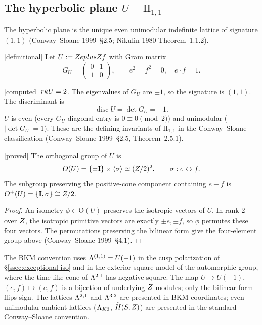 \subsection{The hyperbolic plane $U=\mathrm{II}_{1,1}$}
\label{app:lattice-U}

The hyperbolic plane is the unique even unimodular indefinite lattice
of signature $(1,1)$ (Conway--Sloane 1999~\S2.5; Nikulin 1980
Theorem~1.1.2).

\begin{definition}[$U=\mathrm{II}_{1,1}$]
\label{def:hyperbolic-plane}
\textnormal{[definitional]}
Let $U:=Z eplusZ f$ with Gram matrix
\[
G_U=\begin{pmatrix}0&1\\1&0\end{pmatrix},
\qquad e^2=f^2=0,\quad e\cdot f=1.
\]
\end{definition}

\begin{verification}
\label{ver:U-invariants}
\textnormal{[computed]}
$rk U=2$.  The eigenvalues of $G_U$ are $\pm1$, so the signature is
$(1,1)$.  The discriminant is
\[
\operatorname{disc} U=\det G_U=-1.
\]
$U$ is even (every $G_U$-diagonal entry is $0\equiv 0\pmod2$) and
unimodular ($|\det G_U|=1$).  These are the defining invariants of
$\mathrm{II}_{1,1}$ in the Conway--Sloane classification (Conway--Sloane
1999~\S2.5, Theorem~2.5.1).
\end{verification}

\begin{proposition}
\label{prop:U-aut}
\textnormal{[proved]}
The orthogonal group of $U$ is
\[
O(U)=\{\pm\mathbf{I}\}\times\langle\sigma\rangle
\simeq(Z/2)^{2},
\qquad \sigma:e\leftrightarrow f.
\]
The subgroup preserving the positive-cone component containing
$e+f$ is $O^+(U)=\{\mathbf{I},\sigma\}\cong Z/2$.
\end{proposition}

\begin{proof}
An isometry $\phi\in\mathrm{O}(U)$ preserves the isotropic vectors of
$U$.  In rank $2$ over $Z$, the isotropic primitive vectors are
exactly $\pm e,\pm f$, so $\phi$ permutes these four vectors.  The
permutations preserving the bilinear form give the four-element group
above (Conway--Sloane 1999~\S4.1).
\end{proof}

\begin{remark}
\label{rem:U-vs-HypPlan}
The BKM convention uses
$\Lambda^{(1,1)}=U(-1)$
in the cusp polarization of \S\ref{ssec:exceptional-iso} and in the
exterior-square model of the automorphic group, where the time-like
cone of $\Lambda^{2,1}$ has negative square.
The map
$U\to U(-1)$, $(e,f)\mapsto(e,f)$
is a bijection of underlying $Z$-modules; only the bilinear form
flips sign.  The lattices $\Lambda^{2,1}$ and $\Lambda^{3,2}$ are presented in
BKM coordinates; even-unimodular ambient lattices
($\Lambda_{K3}$, $\widetilde H(S,Z)$) are presented in the standard
Conway--Sloane convention.
\end{remark}

